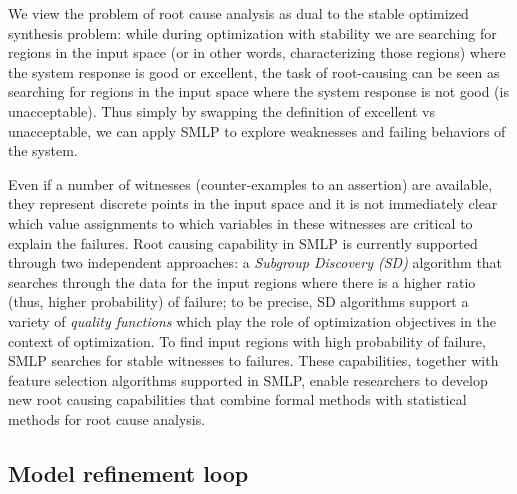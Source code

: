 \documentclass[a4paper,parskip=half]{article} %
\newcommand{\delete}[1]{}
\begin{document}
We view the problem of root cause analysis as dual to the stable optimized synthesis problem: while during optimization with stability we are searching for regions in the input space (or in other words, characterizing those regions) where the system response is good or excellent, the task of root-causing can be seen as searching for regions in the input space where the system response is not good (is unacceptable). Thus simply by swapping the definition of excellent vs unacceptable, we can apply SMLP to explore weaknesses and failing behaviors of the system.

Even if a number of witnesses (counter-examples to an assertion) are available, they represent discrete points in the input space and it is not immediately clear which value assignments to which variables in these witnesses are critical to explain the failures. Root causing capability in SMLP is currently supported through two independent approaches:
a \emph{Subgroup Discovery (SD)} algorithm that searches through the data for the input regions where there is a higher ratio (thus, higher probability) of failure; to be precise, SD algorithms support a variety of \emph{quality functions} which play the role of optimization objectives in the context of optimization.
To find input regions with high probability of failure, SMLP searches for stable witnesses to failures. These capabilities, together with feature selection algorithms supported in SMLP, enable researchers to develop new root causing capabilities that combine formal methods with statistical methods for root cause analysis. 


\subsection{Model refinement loop}\label{s.refinement}
\end{document}
